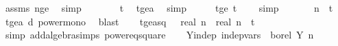 \begin{isabellebody}
\ assms{\isacharparenleft}{\kern0pt}{}{\isacharparenright}{\kern0pt}\ n{\isacharunderscore}{\kern0pt}ge{\isacharunderscore}{\kern0pt}{}\ \isamarkupfalse%
\ simp{\isacharplus}{\kern0pt}\isanewline
\ \ \isamarkupfalse%
\ \isamarkupfalse%
\ {\isachardoublequoteopen}{\isachardot}{\kern0pt}{\isachardot}{\kern0pt}{\isachardot}{\kern0pt}\ {\isasymle}\ t{\isachardoublequoteclose}\ \isamarkupfalse%
\ t{\isacharunderscore}{\kern0pt}ge{\isacharunderscore}{\kern0pt}a\ \isamarkupfalse%
\ simp\isanewline
\ \ \isamarkupfalse%
\ \isamarkupfalse%
\ t{\isacharunderscore}{\kern0pt}ge{\isacharunderscore}{\kern0pt}{}{\isacharcolon}{\kern0pt}\ {\isachardoublequoteopen}t\ {\isasymge}\ {}{\isachardoublequoteclose}\ \isamarkupfalse%
\ simp\isanewline
\isanewline
\ \ \isamarkupfalse%
\ \ {\isachardoublequoteopen}{\isacharparenleft}{\kern0pt}{\isasymalpha}\ {\isacharasterisk}{\kern0pt}\ n{\isacharparenright}{\kern0pt}\ {\isasymle}\ t\ \isamarkupfalse%
\ t{\isacharunderscore}{\kern0pt}ge{\isacharunderscore}{\kern0pt}a\ d\ power{\isacharunderscore}{\kern0pt}mono\ \isamarkupfalse%
\ blast\isanewline
\ \ \isamarkupfalse%
\ t{\isacharunderscore}{\kern0pt}ge{\isacharunderscore}{\kern0pt}a{\isacharunderscore}{\kern0pt}sq{\isacharcolon}{\kern0pt}\ {\isachardoublequoteopen}{\isasymalpha}\ {\isacharasterisk}{\kern0pt}\ real\ n\ {\isacharasterisk}{\kern0pt}\ real\ n\ {\isasymle}\ t\isanewline
\ \ \ \ \isamarkupfalse%
\ {\isacharparenleft}{\kern0pt}simp\ add{\isacharcolon}{\kern0pt}algebra{\isacharunderscore}{\kern0pt}simps\ power{}{\isacharunderscore}{\kern0pt}eq{\isacharunderscore}{\kern0pt}square{\isacharparenright}{\kern0pt}\isanewline
\isanewline
\ \ \isamarkupfalse%
\ Y{\isacharunderscore}{\kern0pt}indep{\isacharcolon}{\kern0pt}\ {\isachardoublequoteopen}indep{\isacharunderscore}{\kern0pt}vars\ {\isacharparenleft}{\kern0pt}{\isasymlambda}{\isacharunderscore}{\kern0pt}{\isachardot}{\kern0pt}\ borel{\isacharparenright}{\kern0pt}\ Y\ {\isacharbraceleft}{\kern0pt}{}{\isachardot}{\kern0pt}{\isachardot}{\kern0pt}{\isacharless}{\kern0pt}n{\isacharbraceright}{\kern0pt}{\isachardoublequoteclose}\isanewline
\ \ \ \ \isamarkupfalse%

\end{isabellebody}
